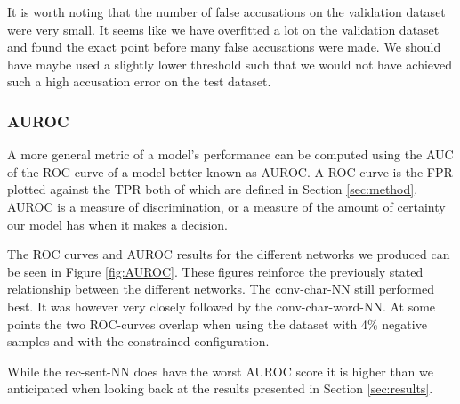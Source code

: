 It is worth noting that the number of false accusations on the validation
dataset were very small. It seems like we have overfitted a lot on the
validation dataset and found the exact point before many false accusations were
made. We should have maybe used a slightly lower threshold such that we would
not have achieved such a high accusation error on the test dataset.


\subsubsection{AUROC}

A more general metric of a model's performance can be computed using the
\gls{AUC} of the \gls{ROC}-curve of a model better known as \gls{AUROC}.
A \gls{ROC} curve is the \gls{FPR} plotted against the \gls{TPR} both of
which are defined in Section \ref{sec:method}. \gls{AUROC} is a measure of
discrimination, or a measure of the amount of certainty our model has when it
makes a decision.

The ROC curves and AUROC results for the different networks we produced
can be seen in Figure \ref{fig:AUROC}. These figures reinforce the
previously stated relationship between the different networks. The
\gls{conv-char-NN} still performed best. It was however very closely followed
by the \gls{conv-char-word-NN}. At some points the two \gls{ROC}-curves overlap
when using the dataset with 4\% negative samples and with the constrained
configuration.

While the \gls{rec-sent-NN} does have the worst AUROC score it is higher
than we anticipated when looking back at the results presented in Section
\ref{sec:results}. 

